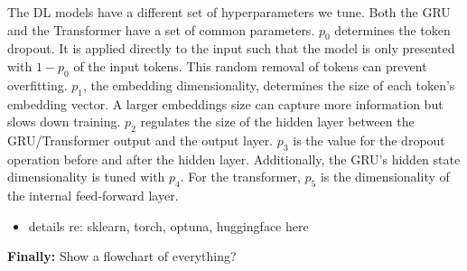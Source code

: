 

The DL models have a different set of hyperparameters we tune. Both the GRU and the Transformer have a set of common parameters. $p_0$ determines the token dropout. It is applied directly to the input such that the model is only presented with $1 - p_0$ of the input tokens. This random removal of tokens can prevent overfitting. $p_1$, the embedding dimensionality, determines the size of each token's embedding vector. A larger embeddings size can capture more information but slows down training. $p_2$ regulates the size of the hidden layer between the GRU/Transformer output and the output layer. $p_3$ is the value for the dropout operation before and after the hidden layer. Additionally, the GRU's hidden state dimensionality is tuned with $p_4$. For the transformer, $p_5$ is the dimensionality of the internal feed-forward layer.


\begin{itemize}[noitemsep]
	\item details re: sklearn, torch, optuna, huggingface here
\end{itemize}




\textbf{Finally:} Show a flowchart of everything?






